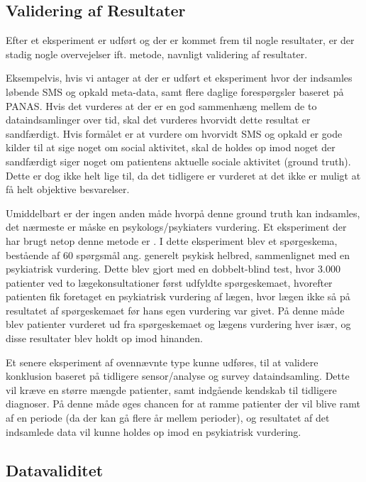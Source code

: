 \subsection{Validering af Resultater}
Efter et eksperiment er udført og der er kommet frem til nogle resultater, er der stadig nogle overvejelser ift. metode, navnligt validering af resultater.

Eksempelvis, hvis vi antager at der er udført et eksperiment hvor der indsamles løbende SMS og opkald meta-data, samt flere daglige forespørgsler baseret på PANAS.
Hvis det vurderes at der er en god sammenhæng mellem de to dataindsamlinger over tid, skal det vurderes hvorvidt dette resultat er sandfærdigt.
Hvis formålet er at vurdere om hvorvidt SMS og opkald er gode kilder til at sige noget om social aktivitet, skal de holdes op imod noget der sandfærdigt siger noget om patientens aktuelle sociale aktivitet (ground truth).
Dette er dog ikke helt lige til, da det tidligere er vurderet at det ikke er muligt at få helt objektive besvarelser.

Umiddelbart er der ingen anden måde hvorpå denne ground truth kan indsamles, det nærmeste er måske en psykologs/psykiaters vurdering.
Et eksperiment der har brugt netop denne metode er \citet{goldberg}.
I dette eksperiment blev et spørgeskema, bestående af 60 spørgsmål ang. generelt psykisk helbred, sammenlignet med en psykiatrisk vurdering.
Dette blev gjort med en dobbelt-blind test, hvor 3.000 patienter ved to lægekonsultationer først udfyldte spørgeskemaet, hvorefter patienten fik foretaget en psykiatrisk vurdering af lægen, hvor lægen ikke så på resultatet af spørgeskemaet før hans egen vurdering var givet.
På denne måde blev patienter vurderet ud fra spørgeskemaet og lægens vurdering hver især, og disse resultater blev holdt op imod hinanden.

Et senere eksperiment af ovennævnte type kunne udføres, til at validere konklusion baseret på tidligere sensor/analyse og survey dataindsamling.
Dette vil kræve en større mængde patienter, samt indgående kendskab til tidligere diagnoser.
På denne måde øges chancen for at ramme patienter der vil blive ramt af en periode (da der kan gå flere år mellem perioder), og resultatet af det indsamlede data vil kunne holdes op imod en psykiatrisk vurdering.

\subsection{Datavaliditet}

